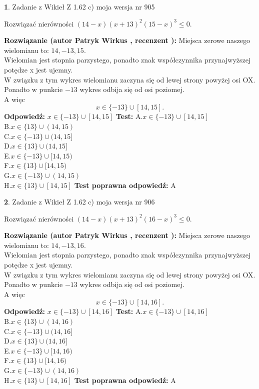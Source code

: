 \documentclass[12pt, a4paper]{article}
\theoremstyle{definition} %
\newtheorem{zad}{}
\newcommand{\zadStart}[1]{\begin{zad}#1\newline}
\newcommand{\zadStop}{\end{zad}}
\newcommand{\rozwStart}[2]{\noindent \textbf{Rozwiązanie (autor #1 , recenzent #2): }\newline}
\newcommand{\rozwStop}{\newline}
\newcommand{\odpStart}{\noindent \textbf{Odpowiedź:}\newline}
\newcommand{\odpStop}{\newline}
\newcommand{\testStart}{\noindent \textbf{Test:}\newline}
\newcommand{\testStop}{\newline}
\newcommand{\kluczStart}{\noindent \textbf{Test poprawna odpowiedź:}\newline}
\newcommand{\kluczStop}{\newline}
\begin{document}
\zadStart{Zadanie z Wikieł Z 1.62 c) moja wersja nr 905}

Rozwiązać nierówności $(14-x)(x+13)^{2}(15-x)^{3}\le0$.
\zadStop
\rozwStart{Patryk Wirkus}{}
Miejsca zerowe naszego wielomianu to: $14, -13, 15$.\\
Wielomian jest stopnia parzystego, ponadto znak współczynnika przy\linebreak najwyższej potędze x jest ujemny.\\ W związku z tym wykres wielomianu zaczyna się od lewej strony powyżej osi OX.\\
Ponadto w punkcie $-13$ wykres odbija się od osi poziomej.\\
A więc $$x \in \{-13\} \cup [14,15].$$
\rozwStop
\odpStart
$x \in \{-13\} \cup [14,15]$
\odpStop
\testStart
A.$x \in \{-13\} \cup [14,15]$\\
B.$x \in \{13\} \cup (14,15)$\\
C.$x \in \{-13\} \cup (14,15]$\\
D.$x \in \{13\} \cup (14,15]$\\
E.$x \in \{-13\} \cup [14,15)$\\
F.$x \in \{13\} \cup [14,15)$\\
G.$x \in \{-13\} \cup (14,15)$\\
H.$x \in \{13\} \cup [14,15]$
\testStop
\kluczStart
A
\kluczStop



\zadStart{Zadanie z Wikieł Z 1.62 c) moja wersja nr 906}

Rozwiązać nierówności $(14-x)(x+13)^{2}(16-x)^{3}\le0$.
\zadStop
\rozwStart{Patryk Wirkus}{}
Miejsca zerowe naszego wielomianu to: $14, -13, 16$.\\
Wielomian jest stopnia parzystego, ponadto znak współczynnika przy\linebreak najwyższej potędze x jest ujemny.\\ W związku z tym wykres wielomianu zaczyna się od lewej strony powyżej osi OX.\\
Ponadto w punkcie $-13$ wykres odbija się od osi poziomej.\\
A więc $$x \in \{-13\} \cup [14,16].$$
\rozwStop
\odpStart
$x \in \{-13\} \cup [14,16]$
\odpStop
\testStart
A.$x \in \{-13\} \cup [14,16]$\\
B.$x \in \{13\} \cup (14,16)$\\
C.$x \in \{-13\} \cup (14,16]$\\
D.$x \in \{13\} \cup (14,16]$\\
E.$x \in \{-13\} \cup [14,16)$\\
F.$x \in \{13\} \cup [14,16)$\\
G.$x \in \{-13\} \cup (14,16)$\\
H.$x \in \{13\} \cup [14,16]$
\testStop
\kluczStart
A
\kluczStop
\end{document}

